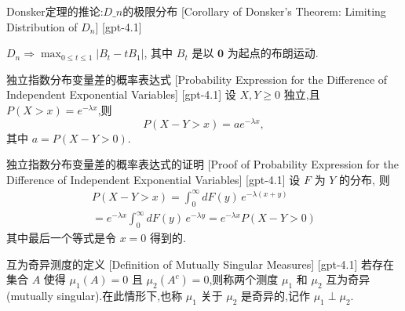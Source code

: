 \documentclass[UTF8]{ctexart}
\begin{document}
    
    
    \begin{thm}
        {Donsker定理的推论:$D\_n$的极限分布}
        [Corollary of Donsker's Theorem: Limiting Distribution of $D_n$]
        [gpt-4.1]
        
$D_{n} \Rightarrow \max_{0 \leq t \leq 1} | B_{t} - t B_{1} |$, 其中 $B_{t}$ 是以 $\mathbf{0}$ 为起点的布朗运动.

    \end{thm}
    
    
    
    \begin{lma}
        {独立指数分布变量差的概率表达式}
        [Probability Expression for the Difference of Independent Exponential Variables]
        [gpt-4.1]
        设 $X, Y \geq 0$ 独立,且 $P(X > x) = e^{-\lambda x}$,则
\[
P(X - Y > x) = a e^{-\lambda x},
\]
其中 $a = P(X - Y > 0)$.
    \end{lma}
    
    
    
    \begin{prf}
        {独立指数分布变量差的概率表达式的证明}
        [Proof of Probability Expression for the Difference of Independent Exponential Variables]
        [gpt-4.1]
        设 $F$ 为 $Y$ 的分布, 则
\[
\begin{array}{l}
P(X - Y > x) = \displaystyle \int_0^{\infty} dF(y)\, e^{-\lambda (x + y)} \\
= e^{-\lambda x} \displaystyle \int_0^{\infty} dF(y)\, e^{-\lambda y} = e^{-\lambda x} P(X - Y > 0)
\end{array}
\]
其中最后一个等式是令 $x = 0$ 得到的.
    \end{prf}
    
    
    
    \begin{dfn}
        {互为奇异测度的定义}
        [Definition of Mutually Singular Measures]
        [gpt-4.1]
        若存在集合 $A$ 使得 $\mu_{1}(A) = 0$ 且 $\mu_{2}(A^{c}) = 0$,则称两个测度 $\mu_{1}$ 和 $\mu_{2}$ 互为奇异(mutually singular).在此情形下,也称 $\mu_{1}$ 关于 $\mu_{2}$ 是奇异的,记作 $\mu_{1} \perp \mu_{2}$.
    \end{dfn}
    
\end{document}
